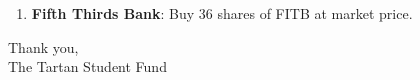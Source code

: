 \documentclass[11pt,pressrelease]{newlfm} %
\begin{document}
\begin{newlfm}




\begin{enumerate}
\item  \textbf{Fifth Thirds Bank}: Buy 36 shares of FITB at market price.





\end{enumerate}


Thank you, \\
The Tartan Student Fund



\end{newlfm}
\end{document}
